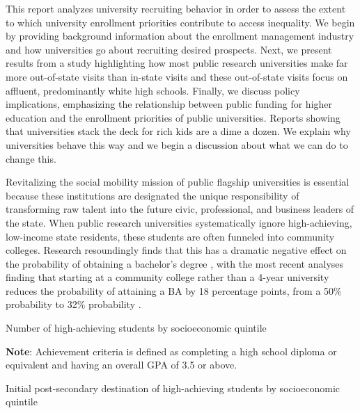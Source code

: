 \documentclass{article}
\begin{document}
This report analyzes university recruiting behavior in order to assess the extent to which university enrollment priorities contribute to access inequality. We begin by providing background information about the enrollment management industry and how universities go about recruiting desired prospects. Next, we present results from a study highlighting how most public research universities make far more out-of-state visits than in-state visits and these out-of-state visits focus on affluent, predominantly white high schools. Finally, we discuss policy implications, emphasizing the relationship between public funding for higher education and the enrollment priorities of public universities. Reports showing that universities stack the deck for rich kids are a dime a dozen. We explain why universities behave this way and we begin a discussion about what we can do to change this.

Revitalizing the social mobility mission of public flagship universities is essential because these institutions are designated the unique responsibility of transforming raw talent into the future civic, professional, and business leaders of the state. When public research universities systematically ignore high-achieving, low-income state residents, these students are often funneled into community colleges. Research resoundingly finds that this has a dramatic negative effect on the probability of obtaining a bachelor's degree \citep{RN4284, RN2261, RN4292, RN4405}, with the most recent analyses finding that starting at a community college rather than a 4-year university reduces the probability of attaining a BA by 18 percentage points, from a 50\% probability to 32\% probability \citep{RN4469_alt}.

\renewcommand{\arraystretch}{1.5}%
\begin{table}[!ht]
    \caption{Number of high-achieving students by socioeconomic quintile}\label{tbl:hsls_tbl1}
    \vspace{0.5cm}
    \fontsize{6}{7}\selectfont{}
    
    \begin{flushleft}\textbf{Note}: Achievement criteria is defined as completing a high school diploma or equivalent and having an overall GPA of 3.5 or above.\end{flushleft}
    \vspace{-0.2cm}
\end{table}

\renewcommand{\arraystretch}{1.5}%
\begin{table}[!ht]
    \caption{Initial post-secondary destination of high-achieving students by socioeconomic quintile}\label{tbl:hsls_tbl2}
    \vspace{0.5cm}
    \fontsize{6}{7}\selectfont{}
    
    \vspace{-0.2cm}
\end{table}
\end{document}
